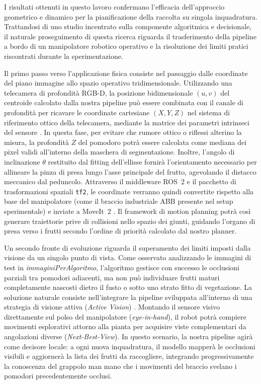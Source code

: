 I risultati ottenuti in questo lavoro confermano l'efficacia dell'approccio geometrico 
e dinamico per la pianificazione della raccolta su singola inquadratura. Trattandosi di 
uno studio incentrato sulla componente algoritmica e decisionale, il naturale proseguimento 
di questa ricerca riguarda il trasferimento della pipeline a bordo di un manipolatore 
robotico operativo e la risoluzione dei limiti pratici riscontrati durante la sperimentazione.

Il primo passo verso l'applicazione fisica consiste nel passaggio dalle coordinate del piano 
immagine allo spazio operativo tridimensionale. Utilizzando una telecamera di profondità 
RGB-D, la posizione bidimensionale $(u, v)$ del centroide calcolato dalla nostra pipeline 
può essere combinata con il canale di profondità per ricavare le coordinate cartesiane $(X, Y, Z)$ 
nel sistema di riferimento ottico della telecamera, mediante la matrice dei parametri intrinseci 
del sensore \cite{gongal2015sensors}. In questa fase, per evitare che rumore ottico o riflessi 
alterino la misura, la profondità $Z$ del pomodoro potrà essere calcolata come mediana dei pixel 
validi all'interno della maschera di segmentazione. Inoltre, l'angolo di inclinazione $\theta$ 
restituito dal fitting dell'ellisse fornirà l'orientamento necessario per allineare la pinza di presa 
lungo l'asse principale del frutto, agevolando il distacco meccanico dal peduncolo. Attraverso il 
middleware ROS~2 e il pacchetto di trasformazioni spaziali \texttt{tf2}, le coordinate verranno 
quindi convertite rispetto alla base del manipolatore (come il braccio industriale ABB presente 
nel setup sperimentale) e inviate a MoveIt~2 \cite{chitta2012moveit}. Il framework di motion planning 
potrà così generare traiettorie prive di collisioni nello spazio dei giunti, guidando l'organo di presa 
verso i frutti secondo l'ordine di priorità calcolato dal nostro planner.

Un secondo fronte di evoluzione riguarda il superamento dei limiti imposti dalla visione 
da un singolo punto di vista. Come osservato analizzando le immagini di test in 
\textit{immaginiPerAlgoritmo}, l'algoritmo gestisce con successo le occlusioni parziali tra 
pomodori adiacenti, ma non può individuare frutti maturi completamente nascosti dietro il fusto 
o sotto uno strato fitto di vegetazione. La soluzione naturale consiste nell'integrare la pipeline 
sviluppata all'interno di una strategia di visione attiva (\textit{Active Vision}) \cite{silwal2017design}. 
Montando il sensore visivo direttamente sul polso del manipolatore (\textit{eye-in-hand}), il robot 
potrà compiere movimenti esplorativi attorno alla pianta per acquisire viste complementari da angolazioni 
diverse (\textit{Next-Best-View}). In questo scenario, la nostra pipeline agirà come decisore locale: a ogni 
nuova inquadratura, il modello mapperà le occlusioni visibili e aggiornerà la lista dei frutti da raccogliere, 
integrando progressivamente la conoscenza del grappolo man mano che i movimenti del braccio svelano i 
pomodori precedentemente occlusi.

